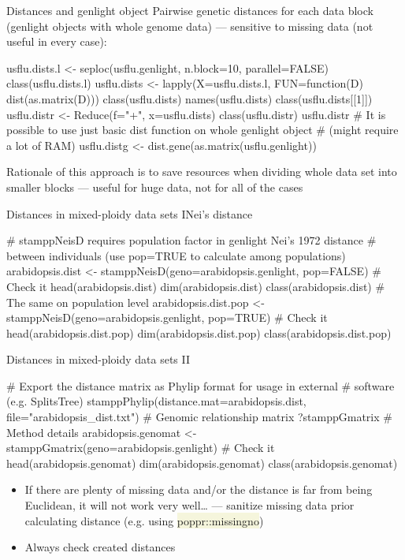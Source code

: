\documentclass[compress, xelatex, 11pt, xcolor=svgnames, aspectratio=169,
	hyperref={
		bookmarks=true,
		unicode=true,
		colorlinks=true,
		pdftitle={Molecular data in R},
		plainpages=false,
		pdfauthor={Vojtech Zeisek},
		pdfsubject={Course about phylogeny and evolution in R},
		pdfcreator={XeLaTeX},
		pdfkeywords={R, evolution, phylogeny, molecular data},
		linkcolor=Crimson, %
		anchorcolor=Magenta, %
		citecolor=Magenta, %
		filecolor=Magenta, %
		menucolor=Magenta, %
		urlcolor=DodgerBlue, %
		},
	url={hyphens, lowtilde} %
	]{beamer}
\renewcommand{\texttt}[1]{\colorbox{Beige}{{\ttfamily #1}}}
\begin{document}
\begin{frame}[fragile]{Distances and genlight object}
	\vfill
	Pairwise genetic distances for each data block (genlight objects with whole genome data) --- sensitive to missing data (not useful in every case):
	\vfill
	\begin{spluscode}
    usflu.dists.l <- seploc(usflu.genlight, n.block=10, parallel=FALSE)
    class(usflu.dists.l)
    usflu.dists <- lapply(X=usflu.dists.l, FUN=function(D) dist(as.matrix(D)))
    class(usflu.dists)
    names(usflu.dists)
    class(usflu.dists[[1]])
    usflu.distr <- Reduce(f="+", x=usflu.dists)
    class(usflu.distr)
    usflu.distr
    # It is possible to use just basic dist function on whole genlight object
    # (might require a lot of RAM)
    usflu.distg <- dist.gene(as.matrix(usflu.genlight))
	\end{spluscode}
	\vfil
	Rationale of this approach is to save resources when dividing whole data set into smaller blocks --- useful for huge data, not for all of the cases
	\vfill
\end{frame}

\begin{frame}[fragile]{Distances in mixed-ploidy data sets I}{Nei's distance}
	\begin{spluscode}
    # stamppNeisD requires population factor in genlight Nei's 1972 distance
    # between individuals (use pop=TRUE to calculate among populations)
    arabidopsis.dist <- stamppNeisD(geno=arabidopsis.genlight, pop=FALSE)
    # Check it
    head(arabidopsis.dist)
    dim(arabidopsis.dist)
    class(arabidopsis.dist)
    # The same on population level
    arabidopsis.dist.pop <- stamppNeisD(geno=arabidopsis.genlight, pop=TRUE)
    # Check it
    head(arabidopsis.dist.pop)
    dim(arabidopsis.dist.pop)
    class(arabidopsis.dist.pop)
	\end{spluscode}
\end{frame}

\begin{frame}[fragile]{Distances in mixed-ploidy data sets II}
	\begin{spluscode}
    # Export the distance matrix as Phylip format for usage in external
    # software (e.g. SplitsTree)
    stamppPhylip(distance.mat=arabidopsis.dist, file="arabidopsis_dist.txt")
    # Genomic relationship matrix
    ?stamppGmatrix # Method details
    arabidopsis.genomat <- stamppGmatrix(geno=arabidopsis.genlight)
    # Check it
    head(arabidopsis.genomat)
    dim(arabidopsis.genomat)
    class(arabidopsis.genomat)
	\end{spluscode}
	\begin{itemize}
		\item If there are plenty of missing data and/or the distance is far from being Euclidean, it will not work very well\ldots{ } --- sanitize missing data prior calculating distance (e.g. using \texttt{poppr::missingno})
		\item Always check created distances
	\end{itemize}
\end{frame}
\end{document}
